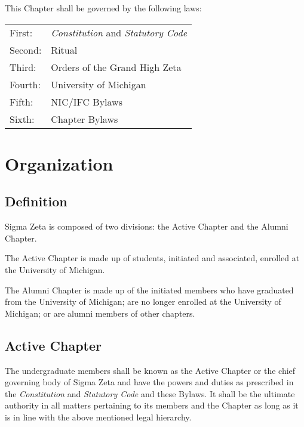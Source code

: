 \documentclass{article}
\begin{document}
This Chapter shall be governed by the following laws:\\
\hspace*{\dimexpr \labelLength - \tabcolsep \relax}%
\begin{tabular}{ll}
  First:  & \emph{Constitution} and \emph{Statutory Code} \\
  Second: & Ritual                                        \\
  Third:  & Orders of the Grand High Zeta                 \\
  Fourth: & University of Michigan                        \\
  Fifth:  & NIC/IFC Bylaws                                \\
  Sixth:  & Chapter Bylaws                                \\
\end{tabular}

\section{Organization}

\subsection{Definition}

Sigma Zeta is composed of two divisions: the Active Chapter and the Alumni
Chapter.

\begin{subsubsectionList}
  \item The Active Chapter is made up of students, initiated and associated,
  enrolled at the University of Michigan.

  \item The Alumni Chapter is made up of the initiated members who have
  graduated from the University of Michigan; are no longer enrolled at the
  University of Michigan; or are alumni members of other chapters.
\end{subsubsectionList}

\pagebreak

\subsection{Active Chapter}

The undergraduate members shall be known as the Active Chapter or the chief
governing body of Sigma Zeta and have the powers and duties as prescribed in the
\emph{Constitution} and \emph{Statutory Code} and these Bylaws. It shall be the
ultimate authority in all matters pertaining to its members and the Chapter as
long as it is in line with the above mentioned legal hierarchy.
\end{document}
